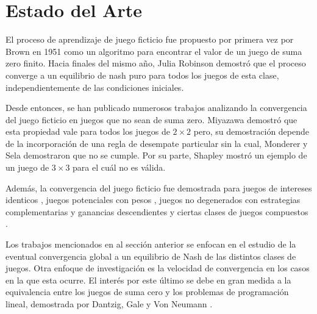 \chapter{Estado del Arte}  \label{cap:relwork}


El proceso de aprendizaje de juego ficticio fue propuesto por primera vez por Brown en 1951 \cite{brown:1951} como un algoritmo para encontrar el valor de un juego de suma zero finito. Hacia finales del mismo año, Julia Robinson \cite{robinson:zerosum} demostró que el proceso converge a un equilibrio de nash puro para todos los juegos de esta clase, independientemente de las condiciones iniciales.

Desde entonces, se han publicado numerosos trabajos analizando la convergencia del juego ficticio en juegos que no sean de suma zero. Miyazawa \cite{miyazawa:2x2} demostró que esta propiedad vale para todos los juegos de $2 \times 2$ pero, su demostración depende de la incorporación de una regla de desempate particular sin la cual, Monderer y Sela \cite{2x2:without} demostraron que no se cumple. Por su parte, Shapley \cite{shapley:3x3} mostró un ejemplo de un juego de $3 \times 3$ para el cuál no es válida.

Además, la convergencia del juego ficticio fue demostrada para juegos de intereses identicos \cite{identical:interests}, juegos potenciales con pesos \cite{weighted:potential}, juegos no degenerados con estrategias complementarias y ganancias descendientes \cite{strategic:complementarities} y ciertas clases de juegos compuestos \cite{compound}.





Los trabajos mencionados en al sección anterior se enfocan en el estudio de la eventual convergencia global
a un equilibrio de Nash de las distintos clases de juegos. Otra enfoque de investigación es la velocidad de
convergencia en los casos en la que esta ocurre.
El interés por este último se debe en gran medida a la equivalencia entre los juegos de suma cero y
los problemas de programación lineal, demostrada por Dantzig, Gale y Von Neumann \cite{fplp:equiv}.